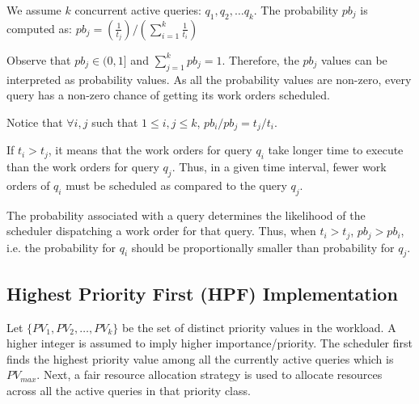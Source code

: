 
We assume $k$ concurrent active queries: $q_{1}, q_{2}, \ldots q_{k}$. 
The probability $pb_{j}$ is computed as:
$pb_{j} = (\frac{1}{t_{j}})/(\sum\limits_{i=1}^{k}\frac{1}{t_{i}})$

Observe that $pb_{j} \in (0, 1]$ and $\sum\limits_{j=1}^{k}pb_{j} = 1$. 
Therefore, the $pb_{j}$ values can be interpreted as probability values. 
As all the probability values are non-zero, every query has a non-zero chance of getting its work orders scheduled. 

Notice that $\forall i, j$ such that $1 \leq i, j \leq k$, 
$pb_{i}/pb_{j} = t_{j}/t_{i}$.

If $t_{i} > t_{j}$, it means that the work orders for query $q_{i}$ take longer time to execute than the work orders for query $q_{j}$. 
Thus, in a given time interval, fewer work orders of $q_{i}$ must be scheduled as compared to the query $q_{j}$. %

The probability associated with a query determines the likelihood of the scheduler dispatching a work order for that query.
Thus, when $t_i > t_j$, $pb_j > pb_i$, i.e.  the probability for $q_{i}$ should be proportionally smaller than probability for $q_{j}$.

\subsection{Highest Priority First (HPF) Implementation}\label{ssec:hpf}
Let $\{PV_{1}, PV_{2}, \ldots, PV_{k}\}$ be the set of distinct priority values in the 
workload. 
A higher integer is assumed to imply higher importance/priority.
The scheduler first finds the highest priority value among all the currently active queries 
which is $PV_{max}$. %
Next, a fair resource allocation strategy is used to allocate resources across all the active queries in that priority class. 

